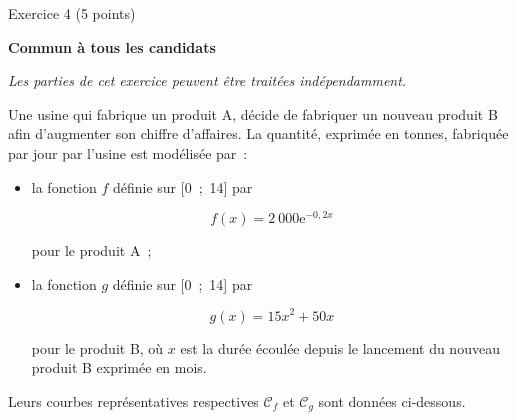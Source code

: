 
          \begin{h2}Exercice 4 (5 points)\end{h2}
          \textbf{Commun à  tous les candidats}
           \medbreak
          \begin{center}
              \textit{ Les parties de cet exercice peuvent être traitées indépendamment.}
          \end{center}
          \medbreak
          Une usine qui fabrique un produit A, décide de fabriquer un nouveau produit B afin d'augmenter son chiffre d'affaires. La quantité, exprimée en tonnes, fabriquée par jour par l'usine est modélisée par~:
          \begin{itemize}
               \item la fonction $f$ définie sur [0~;~14] par
               \par
               \[f(x) = 2~000\text{e}^{-0,2x}\]
               \par
               pour le produit A~;
               \item  la fonction $g$ définie sur [0~;~14] par
               \par
               \[g (x)= 15x^2 + 50 x\]
               \par
               pour le produit B, où $x$ est la durée écoulée depuis le lancement du nouveau produit B exprimée en mois.
          \end{itemize}
          Leurs courbes représentatives respectives $\mathscr{C}_f$ et $\mathscr{C}_g$ sont données ci-dessous.
          \begin{center}
   \begin{extern}%
    \end{extern}
          \end{center}

